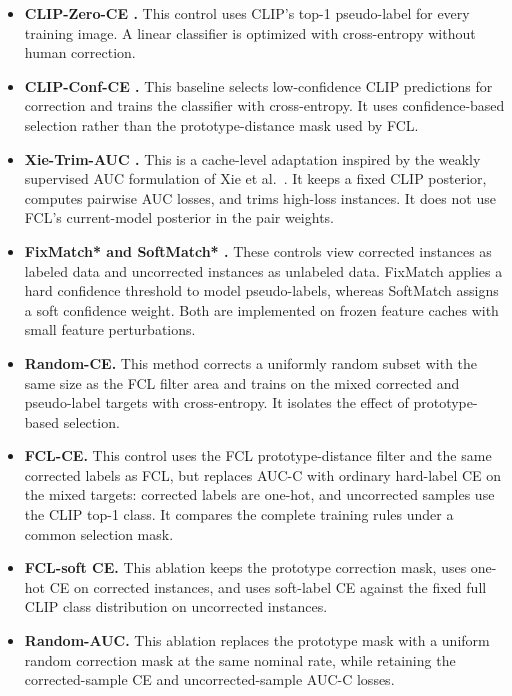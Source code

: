 \documentclass[10pt,twocolumn,letterpaper]{article}
\begin{document}
\begin{itemize}
    \item \textbf{CLIP-Zero-CE \cite{radford2021clip}.} This control uses CLIP's top-1 pseudo-label for
    every training image. A linear classifier is optimized with cross-entropy
    without human correction.

    \item \textbf{CLIP-Conf-CE \cite{radford2021clip}.} This baseline selects
    low-confidence CLIP predictions for correction and trains the classifier
    with cross-entropy. It uses confidence-based selection rather than the
    prototype-distance mask used by FCL.

    \item \textbf{Xie-Trim-AUC \cite{xie2024wsauc}.} This is a cache-level adaptation inspired by
    the weakly supervised AUC formulation of Xie et al.~\cite{xie2024wsauc}.
    It keeps a fixed CLIP posterior, computes pairwise AUC losses, and trims
    high-loss instances. It does not use FCL's current-model posterior in the
    pair weights.

    \item \textbf{FixMatch* \cite{sohn2020fixmatch} and SoftMatch* \cite{chen2023softmatch}.} These controls view corrected
    instances as labeled data and uncorrected instances as unlabeled data.
    FixMatch applies a hard confidence threshold to model pseudo-labels,
    whereas SoftMatch assigns a soft confidence weight. Both are implemented
    on frozen feature caches with small feature perturbations.

    \item \textbf{Random-CE.} This method corrects a uniformly random
    subset with the same size as the FCL filter area and trains on the mixed
    corrected and pseudo-label targets with cross-entropy. It isolates the
    effect of prototype-based selection.

    \item \textbf{FCL-CE.} This control uses the FCL prototype-distance
    filter and the same corrected labels as FCL, but replaces AUC-C with
    ordinary hard-label CE on the mixed targets: corrected labels are one-hot,
    and uncorrected samples use the CLIP top-1 class. It compares the complete
    training rules under a common selection mask.

    \item \textbf{FCL-soft CE.} This ablation keeps the prototype
    correction mask, uses one-hot CE on corrected instances, and uses soft-label
    CE against the fixed full CLIP class distribution on uncorrected instances.

    \item \textbf{Random-AUC.} This ablation replaces the prototype mask
    with a uniform random correction mask at the same nominal rate, while
    retaining the corrected-sample CE and uncorrected-sample AUC-C losses.
\end{itemize}
\end{document}
